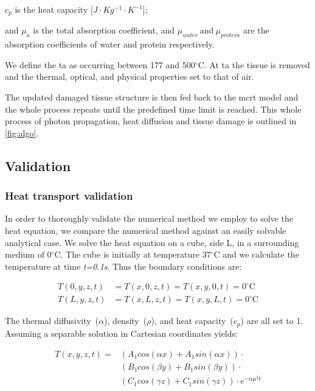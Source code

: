 \indent $c_p$ is the heat capacity [$J\cdot Kg^{-1}\cdot K^{-1}$];

\indent and $\mu_a$ is the total absorption coefficient, and $\mu_{water}\ \text{and}\ \mu_{protein}$ are the absorption coefficients of water and protein respectively.

\medskip

We define the \gls{ta} as occurring between 177 and 500$^{\circ}$C\cite{gerstmann1994char,mckenzie1986three,sagi1992heating}. At \gls{ta} the tissue is removed and the thermal, optical, and physical properties set to that of air.

The updated damaged tissue structure is then fed back to the \gls{mcrt} model and the whole process repeats until the predefined time limit is reached. This whole process of photon propagation, heat diffusion and tissue damage is outlined in \cref{fig:algo}.

\subsection{Validation}

\subsubsection{Heat transport validation}

In order to thoroughly validate the numerical method we employ to solve the heat equation, we compare the numerical method against an easily solvable analytical case. We solve the heat equation on a cube, side L, in a surrounding medium of 0$^{\circ}$C. The cube is initially at temperature 37$^{\circ}$C and we calculate the temperature at time \textit{t=0.1s}. Thus the boundary conditions are:

\begin{align}
T(0,y,z,t)&=T(x,0,z,t)=T(x,y,0,t)=0^{\circ}\text{C} \label{eqn:bc1}\\
T(L,y,z,t)&=T(x,L,z,t)=T(x,y,L,t)=0^{\circ}\text{C} \label{eqn:bc2}
\end{align}

The thermal diffusivity~($\alpha$), density~($\rho$), and heat capacity~($c_p$) are all set to 1. Assuming a separable solution in Cartesian coordinates yields:

\begin{equation}
\begin{split}
T(x,y,z,t)=&(A_1 cos(\alpha x) + A_1 sin(\alpha x))\cdot\\
&(B_1 cos(\beta y) + B_1 sin(\beta y))\cdot\\
&(C_1 cos(\gamma z) + C_1 sin(\gamma z))\cdot e^{-\alpha\mu^2t}\\
\end{split} 
\end{equation}

